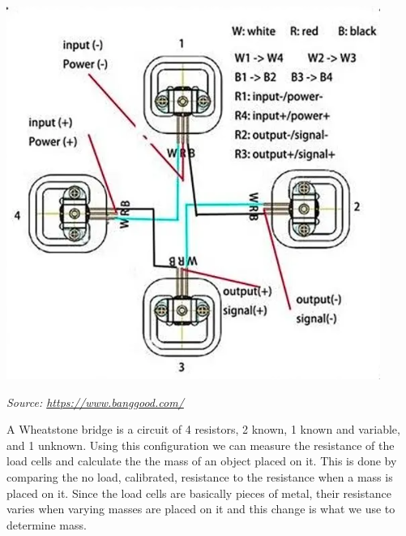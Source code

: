 \documentclass[10pt]{article}
\begin{document}
{\begin{flushleft}
{{\center\includegraphics[scale=.5]{loadcellwiring.png}\par}
{\textit{Source: \href{https://www.banggood.com/4pcs-DIY-50KG-Body-Load-Cell-Weight-Strain-Sensor-Resistance-With-HX711-AD-Module-p-1326815.html?utm_source=googleshopping&utm_medium=cpc_organic&gmcCountry=US&utm_content=shopping&utm_campaign=us-pc&currency=USD&createTmp=1&utm_source=googleshopping&utm_medium=cpc_bgs&utm_content=frank&utm_campaign=frank-ssc-us-toys-tool-ele-newcustom-ncv80-0116&ad_id=411455834827&gclid=Cj0KCQjwy6T1BRDXARIsAIqCTXpl9vvx29pgQ5I5bO3OfoMXg4CrioA-04iYSjtnyxtn5z5hVLJjgT4aAulwEALw_wcB&cur_warehouse=CN}{https://www.banggood.com/}}}

A Wheatstone bridge is a circuit of 4 resistors, 2 known, 1 known and variable, and 1 unknown. Using this configuration we can measure the resistance of the load cells and calculate the the mass of an object placed on it. This is done by comparing the no load, calibrated, resistance to the resistance when a mass is placed on it. Since the load cells are basically pieces of metal, their resistance varies when varying masses are placed on it and this change is what we use to determine mass.

}
\end{flushleft}}
\end{document}

